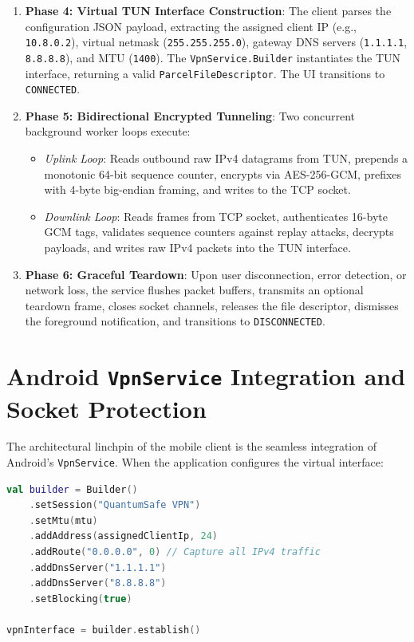 \begin{enumerate}
    \item \textbf{Phase 4: Virtual TUN Interface Construction}: The client parses the configuration JSON payload, extracting the assigned client IP (e.g., \texttt{10.8.0.2}), virtual netmask (\texttt{255.255.255.0}), gateway DNS servers (\texttt{1.1.1.1}, \texttt{8.8.8.8}), and MTU (\texttt{1400}). The \texttt{VpnService.Builder} instantiates the TUN interface, returning a valid \texttt{ParcelFileDescriptor}. The UI transitions to \texttt{CONNECTED}.
    \item \textbf{Phase 5: Bidirectional Encrypted Tunneling}: Two concurrent background worker loops execute:
    \begin{itemize}
        \item \textit{Uplink Loop}: Reads outbound raw IPv4 datagrams from TUN, prepends a monotonic 64-bit sequence counter, encrypts via AES-256-GCM, prefixes with 4-byte big-endian framing, and writes to the TCP socket.
        \item \textit{Downlink Loop}: Reads frames from TCP socket, authenticates 16-byte GCM tags, validates sequence counters against replay attacks, decrypts payloads, and writes raw IPv4 packets into the TUN interface.
    \end{itemize}
    \item \textbf{Phase 6: Graceful Teardown}: Upon user disconnection, error detection, or network loss, the service flushes packet buffers, transmits an optional teardown frame, closes socket channels, releases the file descriptor, dismisses the foreground notification, and transitions to \texttt{DISCONNECTED}.
\end{enumerate}

\section{Android \texttt{VpnService} Integration and Socket Protection}
\label{sec:vpn_service_integration_protect}

The architectural linchpin of the mobile client is the seamless integration of Android's \texttt{VpnService}. When the application configures the virtual interface:
\begin{lstlisting}[language=Kotlin, caption={Virtual TUN Interface Configuration in QuantumSafeVpnService.}]
val builder = Builder()
    .setSession("QuantumSafe VPN")
    .setMtu(mtu)
    .addAddress(assignedClientIp, 24)
    .addRoute("0.0.0.0", 0) // Capture all IPv4 traffic
    .addDnsServer("1.1.1.1")
    .addDnsServer("8.8.8.8")
    .setBlocking(true)

vpnInterface = builder.establish()
\end{lstlisting}

